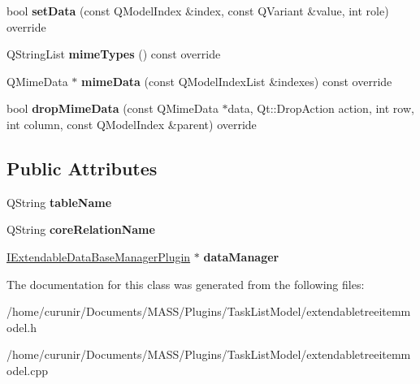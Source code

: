 \begin{DoxyCompactItemize}
\item 
bool {\bfseries set\+Data} (const Q\+Model\+Index \&index, const Q\+Variant \&value, int role) override\hypertarget{class_extendable_tree_item_model_ade1332b1bb879ba4a621898b72037c8d}{}\label{class_extendable_tree_item_model_ade1332b1bb879ba4a621898b72037c8d}

\item 
Q\+String\+List {\bfseries mime\+Types} () const override\hypertarget{class_extendable_tree_item_model_ab3fd3745761bab08ed049cf84386241d}{}\label{class_extendable_tree_item_model_ab3fd3745761bab08ed049cf84386241d}

\item 
Q\+Mime\+Data $\ast$ {\bfseries mime\+Data} (const Q\+Model\+Index\+List \&indexes) const override\hypertarget{class_extendable_tree_item_model_a417f3c9c45819e586b97d3784c016e79}{}\label{class_extendable_tree_item_model_a417f3c9c45819e586b97d3784c016e79}

\item 
bool {\bfseries drop\+Mime\+Data} (const Q\+Mime\+Data $\ast$data, Qt\+::\+Drop\+Action action, int row, int column, const Q\+Model\+Index \&parent) override\hypertarget{class_extendable_tree_item_model_a0ba7b75a8cd3406e52237f85e97017b2}{}\label{class_extendable_tree_item_model_a0ba7b75a8cd3406e52237f85e97017b2}

\end{DoxyCompactItemize}
\subsection*{Public Attributes}
\begin{DoxyCompactItemize}
\item 
Q\+String {\bfseries table\+Name}\hypertarget{class_extendable_tree_item_model_a66679a4354b3e64b53b73fbe54ce0dfc}{}\label{class_extendable_tree_item_model_a66679a4354b3e64b53b73fbe54ce0dfc}

\item 
Q\+String {\bfseries core\+Relation\+Name}\hypertarget{class_extendable_tree_item_model_a641619506ce41dd28183b461ea8c5fda}{}\label{class_extendable_tree_item_model_a641619506ce41dd28183b461ea8c5fda}

\item 
\hyperlink{class_i_extendable_data_base_manager_plugin}{I\+Extendable\+Data\+Base\+Manager\+Plugin} $\ast$ {\bfseries data\+Manager}\hypertarget{class_extendable_tree_item_model_a4811726ebb543469630ff4b5eb4d6c35}{}\label{class_extendable_tree_item_model_a4811726ebb543469630ff4b5eb4d6c35}

\end{DoxyCompactItemize}


The documentation for this class was generated from the following files\+:\begin{DoxyCompactItemize}
\item 
/home/curunir/\+Documents/\+M\+A\+S\+S/\+Plugins/\+Task\+List\+Model/extendabletreeitemmodel.\+h\item 
/home/curunir/\+Documents/\+M\+A\+S\+S/\+Plugins/\+Task\+List\+Model/extendabletreeitemmodel.\+cpp\end{DoxyCompactItemize}
